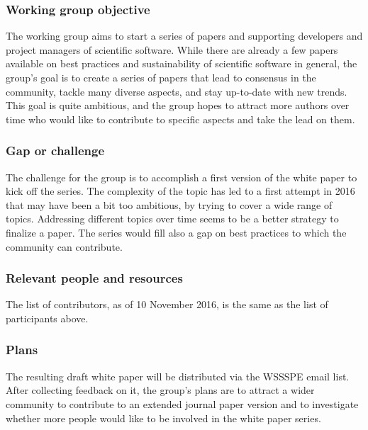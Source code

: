 \subsubsection{Working group objective}


The working group aims to start a series of papers and supporting developers and project managers of scientific software. While there are already a few papers available on best practices and sustainability of scientific software in general, the group's goal is to create a series of papers that lead to consensus in the community, tackle many diverse aspects, and stay up-to-date with new trends. This goal is quite ambitious, and the group hopes to attract more authors over time who would like to contribute to specific aspects and take the lead on them.

\subsubsection{Gap or challenge}

The challenge for the group is to accomplish a first version of the white paper to kick off the series.
The complexity of the topic has led to a first attempt in 2016 that may have been a bit too ambitious,
by trying to cover a wide range of topics. Addressing different topics over time seems to
be a better strategy to finalize a paper. The series would fill also a gap on best practices to which the community can contribute.

\subsubsection{Relevant people and resources}

The list of contributors, as of 10 November 2016, is the same as the list of participants above.

\subsubsection{Plans}

The resulting draft white paper will be distributed via the WSSSPE email list. After collecting feedback on it, the group's plans are to attract a wider community to contribute to an extended journal paper version and to investigate whether more people would like to be involved in the white paper series.

